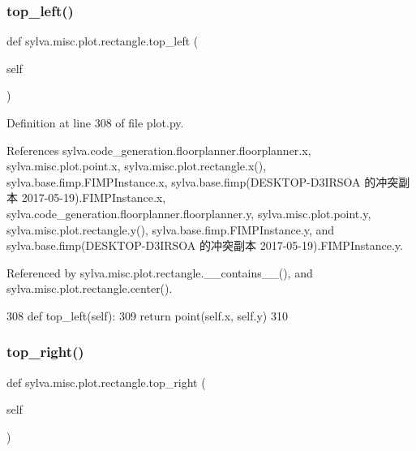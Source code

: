 \subsubsection{\texorpdfstring{top\+\_\+left()}{top\_left()}}
{\footnotesize\ttfamily def sylva.\+misc.\+plot.\+rectangle.\+top\+\_\+left (\begin{DoxyParamCaption}\item[{}]{self }\end{DoxyParamCaption})}



Definition at line 308 of file plot.\+py.



References sylva.\+code\+\_\+generation.\+floorplanner.\+floorplanner.\+x, sylva.\+misc.\+plot.\+point.\+x, sylva.\+misc.\+plot.\+rectangle.\+x(), sylva.\+base.\+fimp.\+F\+I\+M\+P\+Instance.\+x, sylva.\+base.\+fimp(\+D\+E\+S\+K\+T\+O\+P-\/\+D3\+I\+R\+S\+O\+A 的冲突副本 2017-\/05-\/19).\+F\+I\+M\+P\+Instance.\+x, sylva.\+code\+\_\+generation.\+floorplanner.\+floorplanner.\+y, sylva.\+misc.\+plot.\+point.\+y, sylva.\+misc.\+plot.\+rectangle.\+y(), sylva.\+base.\+fimp.\+F\+I\+M\+P\+Instance.\+y, and sylva.\+base.\+fimp(\+D\+E\+S\+K\+T\+O\+P-\/\+D3\+I\+R\+S\+O\+A 的冲突副本 2017-\/05-\/19).\+F\+I\+M\+P\+Instance.\+y.



Referenced by sylva.\+misc.\+plot.\+rectangle.\+\_\+\+\_\+contains\+\_\+\+\_\+(), and sylva.\+misc.\+plot.\+rectangle.\+center().


\begin{DoxyCode}
308         \textcolor{keyword}{def }top\_left(self):
309             \textcolor{keywordflow}{return} point(self.x, self.y)
310 
\end{DoxyCode}
\mbox{\label{classsylva_1_1misc_1_1plot_1_1rectangle_a54324a7b1be1bd85655ee60686d5944f}} 
\subsubsection{\texorpdfstring{top\+\_\+right()}{top\_right()}}
{\footnotesize\ttfamily def sylva.\+misc.\+plot.\+rectangle.\+top\+\_\+right (\begin{DoxyParamCaption}\item[{}]{self }\end{DoxyParamCaption})}




